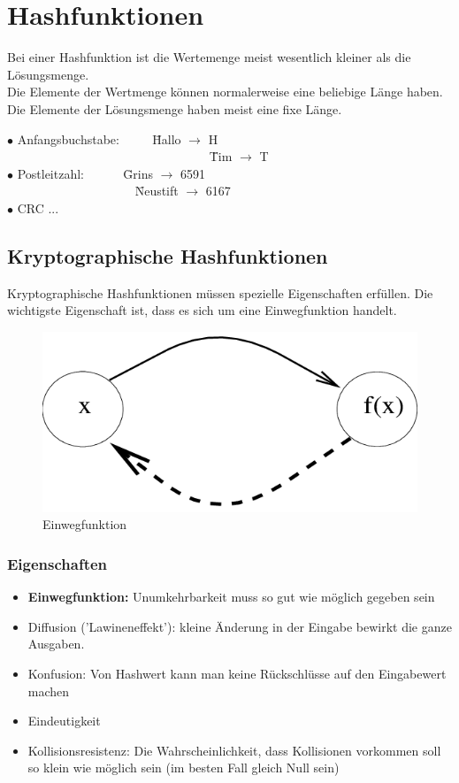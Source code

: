 \chapter{Hashfunktionen}
Bei einer Hashfunktion ist die Wertemenge meist wesentlich kleiner als die Lösungsmenge. \\
Die Elemente der Wertmenge können normalerweise eine beliebige Länge haben. \\
Die Elemente der Lösungsmenge haben meist eine fixe Länge.

\begin{tabbing}
	$\bullet$ Anfangsbuchstabe: ~~~~ \= Hallo $\rightarrow$ H \\
	~~~~~~~~~~~~~~~~~~~~~~~~~~~~~~~~ \= Tim $\rightarrow$ T \\
	$\bullet$ Postleitzahl: ~~~~~ \= Grins $\rightarrow$ 6591 \\
	~~~~~~~~~~~~~~~~~~~~ \= Neustift $\rightarrow$ 6167 \\
	$\bullet$ CRC ...
\end{tabbing}

\section{Kryptographische Hashfunktionen}
Kryptographische Hashfunktionen müssen spezielle Eigenschaften erfüllen. Die wichtigste Eigenschaft ist, dass es sich um eine Einwegfunktion handelt.
\begin{figure}[H]
	\centering
	\includegraphics[width=0.6\linewidth]{figures/oneway.png}
	\caption{Einwegfunktion}
\end{figure}

\subsection*{Eigenschaften}
\begin{itemize}
	\item \textbf{Einwegfunktion:} Unumkehrbarkeit muss so gut wie möglich gegeben sein
	\item Diffusion ('Lawineneffekt'): kleine Änderung in der Eingabe bewirkt die ganze Ausgaben.
	\item Konfusion: Von Hashwert kann man keine Rückschlüsse auf den Eingabewert machen
	\item Eindeutigkeit
	\item Kollisionsresistenz: Die Wahrscheinlichkeit, dass Kollisionen vorkommen soll so klein wie möglich sein (im besten Fall gleich Null sein)
\end{itemize}

